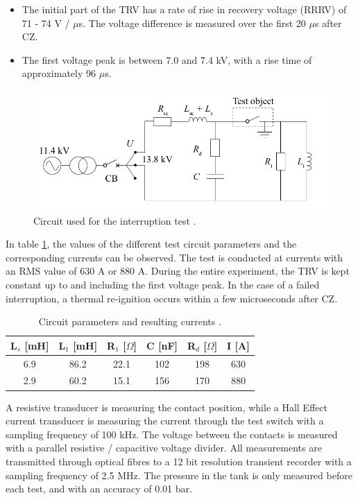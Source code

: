 \documentclass[10pt,b5paper,twoside]{article}
\begin{document}
\begin{itemize}
\item The initial part of the TRV has a rate of rise in recovery voltage (RRRV) of 71 - 74 V / $\mu$s. The voltage difference is measured over the first 20 $\mu$s after CZ.
\item The first voltage peak is between 7.0 and 7.4 kV, with a rise time of approximately 96 $\mu$s.
\end{itemize}

\begin{figure} [H]
\centering
\includegraphics[scale=0.40]{Bilder/Method/circuit.png}
\caption{Circuit used for the interruption test \cite{bib:AFIMVLBA}.} \label{fig:testCurcuit}
\end{figure}

In table \ref{tab:testParameters}, the values of the different test circuit parameters and the corresponding currents can be observed. The test is conducted at currents with an RMS value of 630 A or 880 A. During the entire experiment, the TRV is kept constant up to and including the first voltage peak. In the case of a failed interruption, a thermal re-ignition occurs within a few microseconds after CZ.

\begin{table}[H]
\center
\caption{Circuit parameters and resulting currents \cite{bib:AFIMVLBA}. }
\begin{tabular}{|c|c|c|c|c|c|}
\hline 
L$_s$ [mH] & L$_1$ [mH] & R$_1$ [$\Omega$] & C [nF] & R$_{d}$ [$\Omega$] & I [A] \\ 
\hline 
6.9 & 86.2 & 22.1 & 102 & 198 & 630 \\ 
\hline
2.9 & 60.2 & 15.1 & 156 & 170 & 880 \\
\hline   
\end{tabular} 
\label{tab:testParameters}
\end{table}

A resistive transducer is measuring the contact position, while a Hall Effect current transducer is measuring the current through the test switch with a sampling frequency of 100 kHz. The voltage between the contacts is measured with a parallel resistive / capacitive voltage divider. All measurements are transmitted through optical fibres to a 12 bit resolution transient recorder with a sampling frequency of 2.5 MHz. The pressure in the tank is only measured before each test, and with an accuracy of 0.01 bar. 
\end{document}
